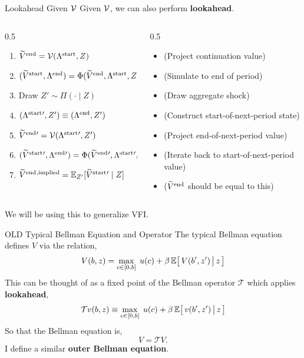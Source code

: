 \documentclass[10pt,aspectratio=169]{beamer}
\begin{document}
\begin{frame}{Lookahead Given $\mathcal{V}$}
  Given $\mathcal{V}$, we can also perform \textbf{lookahead}.
  \begin{columns}
    \begin{column}[T]{0.5\textwidth}
      \begin{enumerate}
        \item $\widetilde{V}^{\mathrm{end}} = \mathcal{V}(\Lambda^{\mathrm{start}}, Z)$
        \item $(\widetilde{V}^{\mathrm{start}}, \Lambda^{\mathrm{end}}) = \Phi(\widetilde{V}^{\mathrm{end}}, \Lambda^{\mathrm{start}}, Z)$
        \item Draw $Z' \sim \Pi(\cdot \mid Z)$
        \item $(\Lambda^{\mathrm{start}}{}', Z') \equiv (\Lambda^{\mathrm{end}}, Z')$
        \item $\widetilde{V}^{\mathrm{end}}{}' = \mathcal{V}(\Lambda^{\mathrm{start}}{}', Z')$
        \item $(\widetilde{V}^{\mathrm{start}}{}', \Lambda^{\mathrm{end}}{}') = \Phi(\widetilde{V}^{\mathrm{end}}{}', \Lambda^{\mathrm{start}}{}', Z')$
        \item $\widetilde{V}^{\mathrm{end}}{}^\text{,implied} = \mathbb{E}_{Z'}[\widetilde{V}^{\mathrm{start}}{}' \mid Z]$
      \end{enumerate}
    \end{column}
    \begin{column}[T]{0.5\textwidth}
      \begin{itemize}
        \item[] (Project continuation value)
        \item[] (Simulate to end of period)
        \item[] (Draw aggregate shock)
        \item[] (Construct start-of-next-period state)
        \item[] (Project end-of-next-period value)
        \item[] (Iterate back to start-of-next-period value)
        \item[] ($\widetilde{V}^{\mathrm{end}}$ should be equal to this)
      \end{itemize}
    \end{column}
  \end{columns}

  We will be using this to generalize VFI.
\end{frame}

\begin{frame}{OLD Typical Bellman Equation and Operator}
  The typical Bellman equation defines $V$ via the relation,
  \[
    V(b, z) = \max_{c \in [0, b]} \; u(c) + \beta \, \mathbb{E}\!\left[\, V(b', z') \,\big|\, z \,\right]
  \]
  This can be thought of as a fixed point of the Bellman operator $\mathcal{T}$ which applies \textbf{lookahead},
  \[
    \mathcal{T}v(b, z) \equiv \max_{c \in [0, b]} \; u(c) + \beta \, \mathbb{E}\!\left[\, v(b', z') \,\big|\, z \,\right]
  \]
  So that the Bellman equation is,
  \[
    V = \mathcal{T}V.
  \]
  I define a similar \textbf{outer Bellman equation}.
\end{frame}
\end{document}
